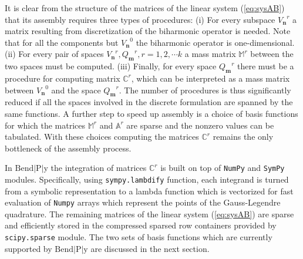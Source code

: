 \documentclass{marine_2015}
\newcommand{\Vh}{\ensuremath{V_{\mathbf{n}}}}
\newcommand{\Qh}{\ensuremath{Q_{\mathbf{m}}}}
\begin{document}
It is clear from the structure of the matrices of the linear system
(\ref{eq:sysAB}) that its assembly requires three types of procedures: (i) For 
every subspace $\Vh^r$ a matrix resulting from discretization of the biharmonic operator is needed.
Note that for all the components but $\Vh^0$ the biharmonic operator is one-dimensional. 
(ii) For every pair of spaces $\Vh^r, \Qh^r, r=1,2,\cdots k$ a mass
matrix $\mathbb{M}^r$ between the two spaces must be computed. (iii) Finally, for
every space $\Qh^r$ there must be a procedure for computing matrix $\mathbb{C}^r$,
which can be interpreted as a mass matrix between $\Vh^0$ and the space
$\Qh^r$. The number of procedures is thus significantly reduced if all the
spaces involved in the discrete formulation are spanned by the same functions. A
further step to speed up assembly is a choice of basis functions for which the
matrices $\mathbb{M}^r$ and $\mathbb{A}^r$ are sparse and the nonzero values can
be tabulated. With these choices computing the matrices $\mathbb{C}^r$ remains the
only bottleneck of the assembly process. 

In $\text{Bend}\!\left|\text{P}\right|\!\text{y}$ the integration of matrices $\mathbb{C}^r$ is built on top of
{\tt{NumPy}}\cite{numpy} and {\tt{SymPy}}\cite{sympy} modules. Specifically, using
{\tt{sympy.lambdify}} function, each integrand is turned from a symbolic representation 
to a lambda function which is vectorized for fast evaluation of {\tt{Numpy}}
arrays which represent the points of the Gauss-Legendre quadrature. The remaining
matrices of the linear system (\ref{eq:sysAB}) are sparse and efficiently stored
in the compressed sparsed row containers provided by {\tt{scipy.sparse}} module.
The two sets of basis functions which are currently supported by $\text{Bend}\!\left|\text{P}\right|\!\text{y}$
are discussed in the next section.
\end{document}
